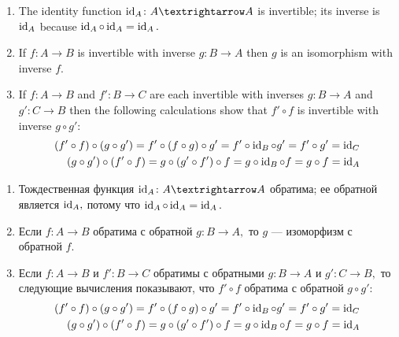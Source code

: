 \documentclass[../main/CT4S-EN-RU]{subfiles}
\begin{document}
\begin{proofENG}
\begin{enumerate}
\item The identity function $\id_A\colon A{→} A$ is invertible; its inverse is $\operatorname{id}_A$ because $\operatorname{id}_A\circ\operatorname{id}_A=\operatorname{id}_A.$
\item If $f\colon A{→} B$ is invertible with inverse $g\colon B{→} A$ then $g$ is an isomorphism with inverse $f.$
\item If $f\colon A{→} B$ and $f'\colon B{→} C$ are each invertible with inverses $g\colon B{→} A$ and $g'\colon C{→} B$ then the following calculations show that $f'\circ f$ is invertible with inverse $g\circ g'$: 
\begin{align*}
(f'\circ f)\circ(g\circ g')=f'\circ(f\circ g)\circ g'=f'\circ\operatorname{id}_B\circ g'=f'\circ g'=\operatorname{id}_C\\
(g\circ g')\circ(f'\circ f)=g\circ(g'\circ f')\circ f=g\circ\operatorname{id}_B\circ f=g\circ f=\operatorname{id}_A
\end{align*}
\end{enumerate}
\end{proofENG}

\begin{proofRUS}
\begin{enumerate}
\item Тождественная функция $\id_A\colon A{→} A$ обратима; ее обратной является $\operatorname{id}_A,$ потому что $\operatorname{id}_A\circ\operatorname{id}_A=\operatorname{id}_A.$
\item Если $f\colon A{→} B$ обратима с обратной $g\colon B{→} A,$ то $g$ — изоморфизм с обратной $f.$
\item Если $f\colon A{→} B$ и $f'\colon B{→} C$ обратимы с обратными $g\colon B{→} A$ и $g'\colon C{→} B,$ то следующие вычисления показывают, что $f'\circ f$ обратима с обратной $g\circ g'$: 
\begin{align*}
(f'\circ f)\circ(g\circ g')=f'\circ(f\circ g)\circ g'=f'\circ\operatorname{id}_B\circ g'=f'\circ g'=\operatorname{id}_C\\
(g\circ g')\circ(f'\circ f)=g\circ(g'\circ f')\circ f=g\circ\operatorname{id}_B\circ f=g\circ f=\operatorname{id}_A
\end{align*}
\end{enumerate}
\end{proofRUS}
\end{document}
